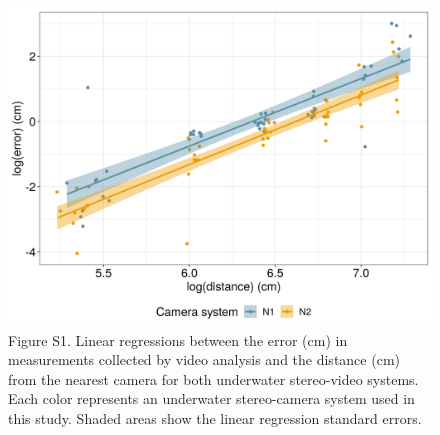 \documentclass[
]{article}
\begin{document}
\begin{figure}
\includegraphics[width=33.33in]{../output/plots/annex_measurementcor} \caption{Figure S1. Linear regressions between the error (cm) in measurements collected by video analysis and the distance (cm) from the nearest camera for both underwater stereo-video systems. Each color represents an underwater stereo-camera system used in this study. Shaded areas show the linear regression standard errors.}\label{fig:unnamed-chunk-5}
\end{figure}

\providecommand{\docline}[3]{\noalign{\global\setlength{\arrayrulewidth}{#1}}\arrayrulecolor[HTML]{#2}\cline{#3}}

\setlength{\tabcolsep}{2pt}

\renewcommand*{\arraystretch}{1.5}
\end{document}
